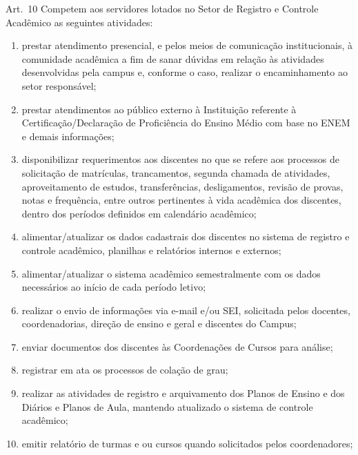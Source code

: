 \documentclass[a4paper,12pt]{report}
\begin{document}
Art.~10 Competem aos servidores lotados no Setor de Registro e Controle Acadêmico as seguintes atividades:

\begin{enumerate}
\renewcommand{\labelenumi}{\Roman{enumi}}

\item prestar atendimento presencial, e pelos meios de comunicação institucionais, à 
      comunidade acadêmica a fim de  sanar dúvidas em relação às atividades desenvolvidas pela campus e, conforme o caso, realizar o encaminhamento ao setor responsável;

\item prestar atendimentos ao público externo à Instituição referente à  
      Certificação/Declaração de Proficiência do Ensino Médio com base no ENEM e demais informações;

\item disponibilizar requerimentos aos discentes no que se refere aos processos de     
      solicitação de matrículas, trancamentos, segunda chamada de atividades, aproveitamento de estudos, transferências, desligamentos, revisão de provas, notas e frequência, entre outros pertinentes à vida acadêmica dos discentes, 
      dentro dos períodos definidos em calendário acadêmico; 

\item alimentar/atualizar os dados cadastrais dos discentes no sistema de registro e 
      controle acadêmico, planilhas e relatórios internos e externos;

\item alimentar/atualizar o sistema acadêmico semestralmente com os dados necessários ao  
      início de cada período letivo;

\item realizar o envio de informações via e-mail e/ou SEI, solicitada pelos docentes, 
      coordenadorias, direção de ensino e geral e discentes do Campus;

\item enviar documentos dos discentes às Coordenações de Cursos para análise;

\item registrar em ata os processos de colação de grau;

\item realizar as atividades de registro e arquivamento dos Planos de Ensino e dos Diários 
      e Planos de Aula, mantendo atualizado o sistema de controle acadêmico;
      
\item emitir relatório de turmas e ou cursos quando solicitados pelos coordenadores;


\end{enumerate}
\end{document}
